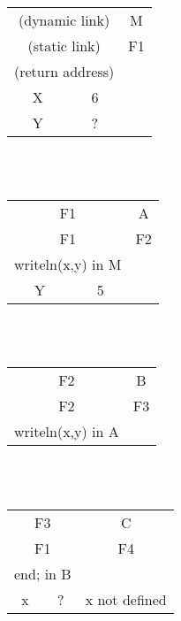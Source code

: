 \documentclass[fleqn, 12pt]{article}
\begin{document}
\begin{tabular}{ | c | c | c}
    \cline{1-2}
    \multicolumn{2}{|c|}{(dynamic link)} & M \\\cline{1-2}
    \multicolumn{2}{|c|}{(static link)} & F1 \\\cline{1-2}
    \multicolumn{2}{|c|}{(return address)} \\\cline{1-2}
    X & 6\\\cline{1-2}
    Y & ?\\\cline{1-2}
\end{tabular}\\\\

\begin{tabular}{ | c | c | c}
    \cline{1-2}
    \multicolumn{2}{|c|}{F1} & A \\\cline{1-2}
    \multicolumn{2}{|c|}{F1} & F2 \\\cline{1-2}
    \multicolumn{2}{|c|}{writeln(x,y) in M} & \\\cline{1-2}
    Y & 5\\\cline{1-2}
\end{tabular}\\\\

\begin{tabular}{ | c | c | c}
    \cline{1-2}
    \multicolumn{2}{|c|}{F2} & B \\\cline{1-2}
    \multicolumn{2}{|c|}{F2} & F3 \\\cline{1-2}
    \multicolumn{2}{|c|}{writeln(x,y) in A} & \\\cline{1-2}
\end{tabular}\\\\

\begin{tabular}{ | c | c | c}
    \cline{1-2}
    \multicolumn{2}{|c|}{F3} & C \\\cline{1-2}
    \multicolumn{2}{|c|}{F1} & F4 \\\cline{1-2}
    \multicolumn{2}{|c|}{end; in B} & \\\cline{1-2}
    x & ? & x not defined\\\cline{1-2}
\end{tabular}\\\\
\end{document}
